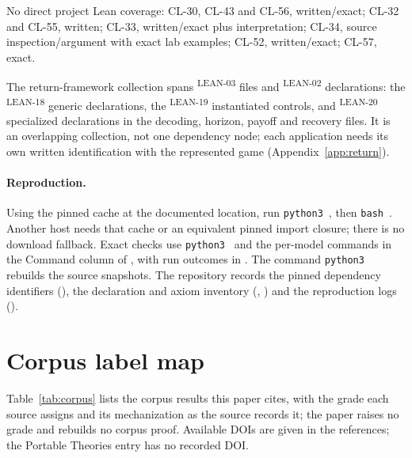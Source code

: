\documentclass[pdflatex,sn-basic]{sn-jnl}%
\newcommand{\slot}[1]{}%
\newcommand{\rec}[1]{\ifannotated\textsuperscript{\textcolor{blue!60!black}{\tiny#1}}\fi}
\begin{document}
\begin{appendices}
No direct project Lean coverage: CL-30, CL-43 and CL-56, written/exact; CL-32 and CL-55, written; CL-33, written/exact plus interpretation; CL-34, source inspection/argument with exact lab examples; CL-52, written/exact; CL-57, exact.

The return-framework collection spans \numLeanDEighteenFiles\rec{LEAN-03} files and \numLeanDEighteenDecls\rec{LEAN-02} declarations: the \numLeanDEighteenGeneric\rec{LEAN-18} generic declarations, the \numLeanDEighteenControls\rec{LEAN-19} instantiated controls, and \numLeanDEighteenSpecialized\rec{LEAN-20} specialized declarations in the decoding, horizon, payoff and recovery files. It is an overlapping collection, not one dependency node; each application needs its own written identification with the represented game (Appendix~\ref{app:return}).

\paragraph{Reproduction.} Using the pinned cache at the documented location, run \texttt{python3}~, then \texttt{bash}~. Another host needs that cache or an equivalent pinned import closure; there is no download fallback. Exact checks use \texttt{python3}~ and the per-model commands in the Command column of , with run outcomes in . The command \texttt{python3}~ rebuilds the source snapshots. The repository records the pinned dependency identifiers (), the declaration and axiom inventory (, ) and the reproduction logs ().

\FloatBarrier%
\section{Corpus label map}\label{app:corpus}

\slot{C}
Table~\ref{tab:corpus} lists the corpus results this paper cites, with the grade each source assigns and its mechanization as the source records it; the paper raises no grade and rebuilds no corpus proof. Available DOIs are given in the references; the Portable Theories entry has no recorded DOI.


\end{appendices}
\end{document}
